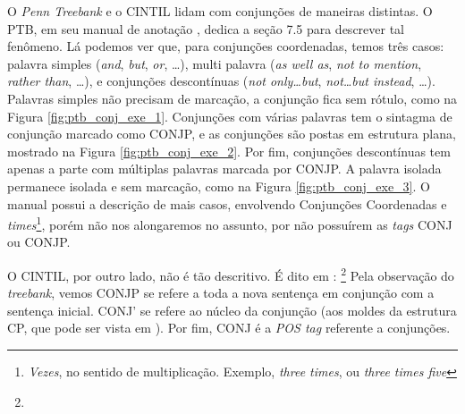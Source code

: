 O \textit{Penn Treebank} e o CINTIL lidam com conjunções de maneiras distintas. O PTB, em seu manual de anotação \cite[p~117]{bracketing_ptb}, dedica a seção 7.5 para descrever tal fenômeno. Lá podemos ver que, para conjunções coordenadas, temos três casos: palavra simples (\textit{and}, \textit{but}, \textit{or}, \ldots), multi palavra (\textit{as well as}, \textit{not to mention}, \textit{rather than}, \ldots), e conjunções descontínuas (\textit{not only\ldots but}, \textit{not\ldots but instead}, \ldots). Palavras simples não precisam de marcação, a conjunção fica sem rótulo, como na Figura \ref{fig:ptb_conj_exe_1}. Conjunções com várias palavras tem o sintagma de conjunção marcado como CONJP, e as conjunções são postas em estrutura plana, mostrado na Figura \ref{fig:ptb_conj_exe_2}. Por fim, conjunções descontínuas tem apenas a parte com múltiplas palavras marcada por CONJP. A palavra isolada permanece isolada e sem marcação, como na Figura \ref{fig:ptb_conj_exe_3}. O manual possui a descrição de mais casos, envolvendo Conjunções Coordenadas e \textit{times}\footnote{\textit{Vezes}, no sentido de multiplicação. Exemplo, \textit{three times}, ou \textit{three times five}}, porém não nos alongaremos no assunto, por não possuírem as \textit{tags} CONJ ou CONJP.
\begin{center}

\end{center}
\begin{center}

\end{center}
\begin{center}

\end{center}

O CINTIL, por outro lado, não é tão descritivo. É dito em \cite[p~20]{cintil_handbook}:
\footnote{}
Pela observação do \textit{treebank}, vemos CONJP se refere a toda a nova sentença em conjunção com a sentença inicial. CONJ’ se refere ao núcleo da conjunção (aos moldes da estrutura CP, que pode ser vista em \cite[p~63]{mioto2013novo}). Por fim, CONJ é a \textit{POS tag} referente a conjunções.

